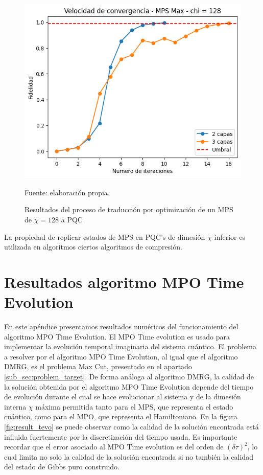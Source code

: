 \begin{figure}[!h]
    \centering
    \includegraphics[scale = 0.7]{plt/a04-mps_to_pqc_o.png}
    \caption{Resultados del proceso de traducción por optimización de un MPS de $\chi = 128$ a PQC}
    Fuente: elaboración propia.
    \label{fig:r_mps_to_pqc_o}
\end{figure}

La propiedad de replicar estados de MPS en PQC's de dimesión $\chi$ inferior es utilizada en algoritmos ciertos algoritmos de compresión.

\section{Resultados algoritmo MPO Time Evolution}
\label{apendix:mpo_time_evolution}

En este apéndice presentamos resultados numéricos del funcionamiento del algoritmo MPO Time Evolution. El MPO Time evolution es usado para implementar la evolución temporal imaginaria del sistema cuántico. El problema a resolver por el algoritmo MPO Time Evolution, al igual que el algoritmo DMRG, es el problema Max Cut, presentado en el apartado \ref{sub_sec:problem_target}. De forma análoga al algoritmo DMRG, la calidad de la solución obtenida por el algoritmo MPO Time Evolution depende del tiempo de evolución durante el cual se hace evolucionar al sistema y de la dimesión interna $\chi$ máxima permitida tanto para el MPS, que representa el estado cuántico, como para el MPO, que representa el Hamiltoniano. En la figura \ref{fig:result_tevo} se puede observar como la calidad de la solución encontrada está influida fuertemente por la discretización del tiempo usada. Es importante recordar que el error asociado al MPO Time evolution es del orden de $(\delta \tau)^2$, lo cual limita no solo la calidad de la solución encontrada si no también la calidad del estado de Gibbs puro construido.

